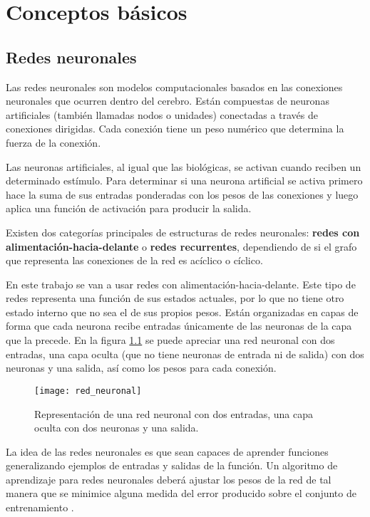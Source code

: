 \chapter{Conceptos básicos}
\label{BasicConcepts}

\section{Redes neuronales}
Las redes neuronales son modelos computacionales basados en las conexiones
neuronales que ocurren dentro del cerebro. Están compuestas de neuronas
artificiales (también llamadas nodos o unidades) conectadas a través de
conexiones dirigidas. Cada conexión tiene un peso numérico que determina la
fuerza de la conexión.

Las neuronas artificiales, al igual que las biológicas, se activan cuando
reciben un determinado estímulo. Para determinar si una neurona artificial se
activa primero hace la suma de sus entradas ponderadas con los pesos de las
conexiones y luego aplica una función de activación para producir la salida.

Existen dos categorías principales de estructuras de redes neuronales:
\textbf{redes con alimentación-hacia-delante} o \textbf{redes recurrentes},
dependiendo de si el grafo que representa las conexiones de la red es acíclico
o cíclico.

En este trabajo se van a usar redes con alimentación-hacia-delante. Este tipo
de redes representa una función de sus estados actuales, por lo que no tiene
otro estado interno que no sea el de sus propios pesos. Están organizadas en
capas de forma que cada neurona recibe entradas únicamente de las neuronas de
la capa que la precede. En la figura \ref{red_neuronal} se puede apreciar una
red neuronal con dos entradas, una capa oculta (que no tiene neuronas de
entrada ni de salida) con dos neuronas y una salida, así como los pesos para
cada conexión.

\begin{figure}
    \centering
    \caption{Representación de una red neuronal con dos entradas, una
    capa oculta con dos neuronas y una salida.}
  \label{red_neuronal}
  \texttt{[image: red\_neuronal]}
\end{figure}

La idea de las redes neuronales es que sean capaces de aprender funciones
generalizando ejemplos de entradas y salidas de la función. Un algoritmo de
aprendizaje para redes neuronales deberá ajustar los pesos de la red de tal
manera que se minimice alguna medida del error producido sobre el conjunto de
entrenamiento \parencite{russel_norvig}.


